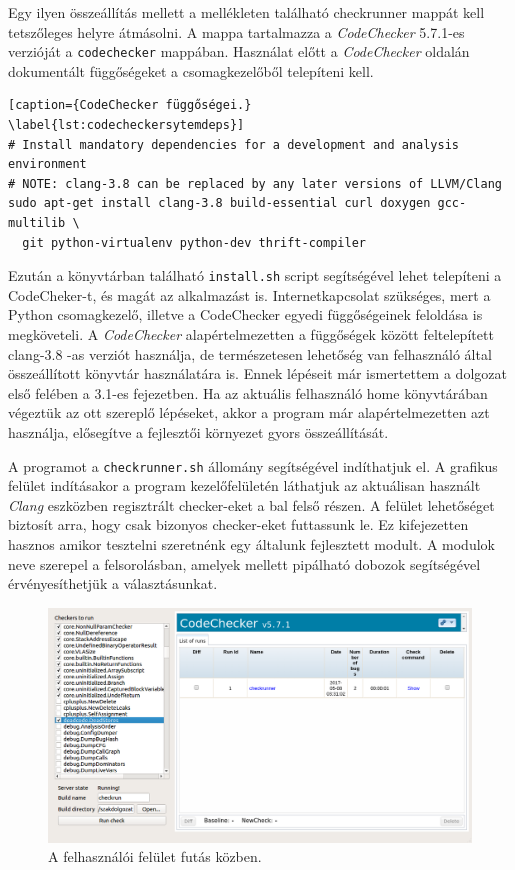 \documentclass[a4paper,12pt]{report}
\begin{document}
Egy ilyen összeállítás mellett a mellékleten található checkrunner mappát kell tetszőleges helyre átmásolni. A mappa tartalmazza a \emph{CodeChecker} 5.7.1-es verzióját a \texttt{codechecker} mappában. Használat előtt a \emph{CodeChecker} oldalán dokumentált függőségeket a csomagkezelőből telepíteni kell.

\begin{lstlisting}[caption={CodeChecker függőségei.}
\label{lst:codecheckersytemdeps}]
# Install mandatory dependencies for a development and analysis environment
# NOTE: clang-3.8 can be replaced by any later versions of LLVM/Clang
sudo apt-get install clang-3.8 build-essential curl doxygen gcc-multilib \
  git python-virtualenv python-dev thrift-compiler
\end{lstlisting}

Ezután a könyvtárban található \texttt{install.sh} script segítségével lehet telepíteni a CodeCheker-t, és magát az alkalmazást is. Internetkapcsolat szükséges, mert a Python csomagkezelő, illetve a CodeChecker egyedi függőségeinek feloldása is megköveteli. A \emph{CodeChecker} alapértelmezetten a függőségek között feltelepített clang-3.8 -as verziót használja, de természetesen lehetőség van felhasználó által összeállított könyvtár használatára is. Ennek lépéseit már ismertettem a dolgozat első felében a 3.1-es fejezetben. Ha az aktuális felhasználó home könyvtárában végeztük az ott szereplő lépéseket, akkor a program már alapértelmezetten azt használja, elősegítve a fejlesztői környezet gyors összeállítását.

A programot a \texttt{checkrunner.sh} állomány segítségével indíthatjuk el. A grafikus felület indításakor a program kezelőfelületén láthatjuk az aktuálisan használt \emph{Clang} eszközben regisztrált checker-eket a bal felső részen. A felület lehetőséget biztosít arra, hogy csak bizonyos checker-eket futtassunk le. Ez kifejezetten hasznos amikor tesztelni szeretnénk egy általunk fejlesztett modult. A modulok neve szerepel a felsorolásban, amelyek mellett pipálható dobozok segítségével érvényesíthetjük a választásunkat.


\begin{figure}[h]
\caption{A felhasználói felület futás közben.}
\centering
\includegraphics[scale=0.36]{ui.png}
\end{figure}
\end{document}
